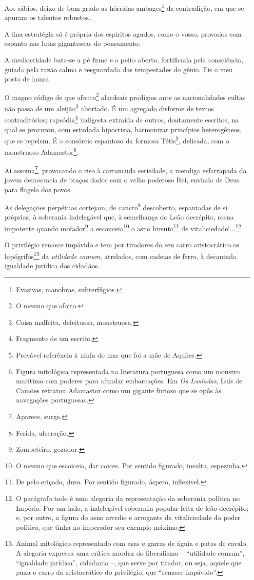 Aos sábios, deixo de bom grado as hórridas ambages\footnote{Evasivas,
  manobras, subterfúgios.} da contradição, em que se apuram os talentos
robustos.

A fina estratégia só é própria dos espíritos agudos, como o vosso,
provados com espanto nas lutas gigantescas do pensamento.

A mediocridade bata-se a pé firme e a peito aberto, fortificada pela
consciência, guiada pela razão calma e resguardada das tempestades do
gênio. Eis o meu posto de honra.

O magno código de que afouto\footnote{O mesmo que afoito.} alardeais
prodígios ante as nacionalidades cultas não passa de um
aleijão\footnote{Coisa malfeita, defeituosa, monstruosa.} abortado. É
um agregado disforme de textos contraditórios; rapsódia\footnote{
  Fragmento de um escrito.} indigesta extraída de outros, doutamente
escritos, na qual se procurou, com estudada hipocrisia, harmonizar
princípios heterogêneos, que se repelem. É o consórcio espantoso da
formosa Tétis\footnote{Provável referência à ninfa do mar que foi a
  mãe de Aquiles.}, delicada, com o monstruoso Adamastor\footnote{
  Figura mitológica representada na literatura portuguesa como um
  monstro marítimo com poderes para afundar embarcações. Em \emph{Os
  Lusíadas}, Luís de Camões retratou Adamastor como um gigante furioso
  que se opôs às navegações portuguesas.}.

Aí assoma\footnote{Aparece, surge.}, provocando o riso à carrancuda
seriedade, a mendiga esfarrapada da jovem democracia de braços dados com
o velho poderoso Rei, enviado de Deus para flagelo dos povos.

As delegações perpétuas cortejam, de cancro\footnote{Ferida,
  ulceração.} descoberto, espantadas de si próprias, à soberania
indelegável que, à semelhança do Leão decrépito, rosna impotente quando
mofador\footnote{Zombeteiro, gozador.} a escouceia\footnote{O mesmo
  que escoiceia, dar coices. Por sentido figurado, insulta, espezinha.}
o asno hirsuto\footnote{De pelo eriçado, duro. Por sentido figurado,
  áspero, inflexível.} de vitaliciedade!...\footnote{O parágrafo todo
  é uma alegoria da representação da soberania política no Império. Por
  um lado, a indelegável soberania popular feita de leão decrépito; e,
  por outro, a figura do asno arredio e arrogante da vitaliciedade do
  poder político, que tinha no imperador seu exemplo máximo.}

O privilégio renasce impávido e tem por tiradores do seu carro
aristocrático os hipógrifos\footnote{Animal mitológico representado
  com asas e garras de águia e patas de cavalo. A alegoria expressa uma
  crítica mordaz do liberalismo -- ``utilidade comum'', ``igualdade
  jurídica'', cidadania --, que serve por tirador, ou seja, aquele que
  puxa o carro da aristocrático do privilégio, que ``renasce impávido''.}
da \emph{utilidade comum}, atrelados, com cadeias de ferro, à decantada
igualdade jurídica dos cidadãos.

